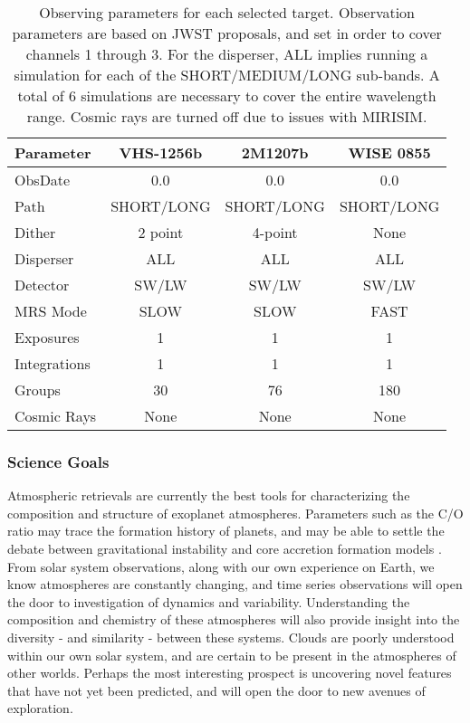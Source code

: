 \begin{table}[t]
	\centering
	\begin{tabular}{l|ccc}
		\toprule
		\textbf{Parameter} & \textbf{VHS-1256b} & \textbf{2M1207b} & \textbf{WISE 0855}\\
		\midrule
		ObsDate & 0.0 & 0.0 & 0.0\\
		Path & SHORT/LONG & SHORT/LONG & SHORT/LONG\\
		Dither & 2 point & 4-point & None\\
		Disperser & ALL & ALL & ALL\\
		Detector & SW/LW & SW/LW & SW/LW\\
		MRS Mode & SLOW & SLOW & FAST\\
		Exposures & 1 & 1 & 1\\
		Integrations & 1 & 1 & 1\\
		Groups & 30 & 76 & 180\\
		Cosmic Rays & None & None & None\\
		\bottomrule
	\end{tabular}
	\caption[Observation Parameters]{Observing parameters for each selected target. Observation parameters are based on JWST proposals, and set in order to cover channels 1 through 3. For the disperser, ALL implies running a simulation for each of the SHORT/MEDIUM/LONG sub-bands. A total of 6 simulations are necessary to cover the entire wavelength range. Cosmic rays are turned off due to issues with MIRISIM.}
	\label{tab:obsparams}
\end{table}
\subsubsection{Science Goals}
Atmospheric retrievals are currently the best tools for characterizing the composition and structure of exoplanet atmospheres. 
Parameters such as the C/O ratio may trace the formation history of planets, and may be able to settle the debate between gravitational instability and core accretion formation models \parencite{Madhusudhan2012,Moses2013}.
From solar system observations, along with our own experience on Earth, we know atmospheres are constantly changing, and time series observations will open the door to investigation of dynamics and variability.
Understanding the composition and chemistry of these atmospheres will also provide insight into the diversity - and similarity - between these systems.
Clouds are poorly understood within our own solar system, and are certain to be present in the atmospheres of other worlds.
Perhaps the most interesting prospect is uncovering novel features that have not yet been predicted, and will open the door to new avenues of exploration.

